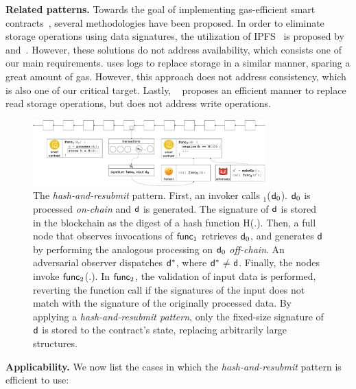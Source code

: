 \noindent \textbf{Related patterns.} Towards the goal of implementing
gas-efficient smart contracts~\cite{contract-opt-1, contract-opt-2,
slither, madmax}, several methodologies have been proposed. In order to
eliminate
storage operations using data signatures, the utilization of IPFS~\cite{ipfs}
is proposed by \cite{ipfs-1} and~\cite{ipfs-2}. However, these solutions do not
address availability, which consists one of our main requirements.
\cite{logs} uses logs to replace storage in a similar manner, sparing a great
amount of gas. However, this approach does not address consistency, which is
also one of our critical target. Lastly,
~\cite{memory-array} proposes an efficient manner to replace read storage
operations, but does not address write operations.


\begin{figure}[h]
    \begin{center} \includegraphics[width=0.8\textwidth]{figures/har-pattern.pdf}
    \end{center}

    \caption{The \emph{hash-and-resubmit} pattern. First, an invoker calls
        \proc$_1$($\mathsf{d}_0$). $\mathsf{d}_0$ is processed \emph{on-chain} and
        $\mathsf{d}$ is generated. The signature of $\mathsf{d}$ is stored in the
        blockchain as the digest of a hash function \textsf{H}(.). Then,
        a full node that observes invocations of $\textsf{func}_1$ retrieves $\mathsf{d}_0$,
        and generates $\mathsf{d}$ by performing the analogous processing on
        $\mathsf{d}_0$ \emph{off-chain}. An adversarial observer dispatches
        $\mathsf{d^*}$, where $\mathsf{d^*}$$\neq$$\mathsf{d}$. Finally, the nodes invoke
        $\textsf{func}_2$(.). In $\textsf{func}_2$, the validation of input data is performed,
        reverting the function call if the signatures of the input does not
        match with the signature of the originally processed data. By applying
        a \emph{hash-and-resubmit pattern}, only the fixed-size signature of
        $\mathsf{d}$ is stored to the contract's state, replacing arbitrarily large
        structures.}

        \label{fig:har-pattern}
\end{figure}

\noindent
\textbf{Applicability.}
We now list the cases in which the \emph{hash-and-resubmit} pattern is
efficient to use:

